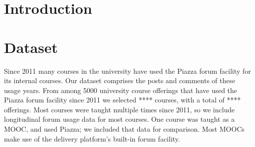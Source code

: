 \section{Introduction}

\section{Dataset}

Since 2011 many courses in the university have used the Piazza forum
facility for its internal courses. Our dataset comprises the posts and
comments of these usage years. From among 5000 university course
offerings that have used the Piazza forum facility since 2011 we
selected **** courses, with a total of **** offerings. Most courses
were taught multiple times since 2011, so we include longitudinal
forum usage data for most courses. One course was taught as a MOOC,
and used Piazza; we included that data for comparison. Most MOOCs make
use of the delivery platform's built-in forum facility.

